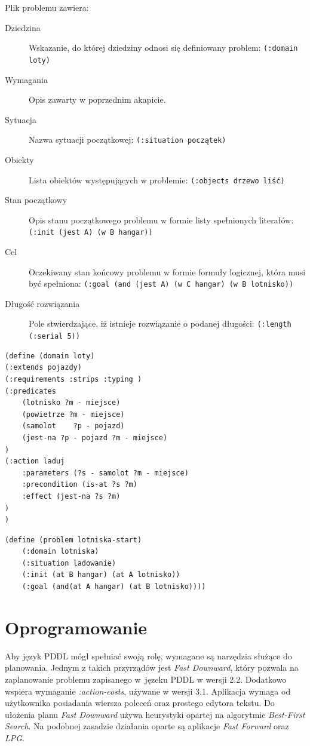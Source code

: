 Plik problemu zawiera:
\begin{description}
\item[Dziedzina] Wskazanie, do której dziedziny odnosi się definiowany problem: \texttt{(:domain loty)}
\item[Wymagania] Opis zawarty w poprzednim akapicie.
\item[Sytuacja] Nazwa sytuacji początkowej: \texttt{(:situation początek)}
\item[Obiekty] Lista obiektów występujących w problemie: \texttt{(:objects drzewo liść)}
\item[Stan początkowy] Opis stanu początkowego problemu w formie listy spełnionych literałów: \texttt{(:init (jest A) (w B hangar))}
\item[Cel] Oczekiwany stan końcowy problemu w formie formuły logicznej, która musi być spełniona: \texttt{(:goal (and (jest A) (w C hangar) (w B lotnisko))}
\item[Długość rozwiązania] Pole stwierdzające, iż istnieje rozwiązanie o podanej długości: \texttt{(:length (:serial 5))}
\end{description}
\begin{Code}
\begin{lstlisting}[language=LISP,frame=single,label=ana_code, caption=Zawartość przykładowego pliku domeny]
(define (domain loty)
(:extends pojazdy)
(:requirements :strips :typing )
(:predicates
	(lotnisko ?m - miejsce)
	(powietrze ?m - miejsce)
	(samolot	?p - pojazd)
	(jest-na ?p - pojazd ?m - miejsce)
)
(:action laduj
	:parameters (?s - samolot ?m - miejsce)
   	:precondition (is-at ?s ?m) 
	:effect (jest-na ?s ?m) 
)
)
\end{lstlisting}
\end{Code}

\begin{Code}
\begin{lstlisting}[language=LISP,frame=single,label=ana_code, caption=Zawartość przykładowego pliku problemu]
(define (problem lotniska-start)
	(:domain lotniska)
	(:situation ladowanie)
	(:init (at B hangar) (at A lotnisko))
	(:goal (and(at A hangar) (at B lotnisko))))
\end{lstlisting}
\end{Code}

\section{Oprogramowanie}
Aby język PDDL mógł spełniać swoją rolę, wymagane są narzędzia służące do planowania. Jednym z takich przyrządów jest \textit{Fast Downward}, który pozwala na zaplanowanie problemu zapisanego w~jęzeku PDDL w wersji 2.2. Dodatkowo wspiera wymaganie \textit{:action-costs}, używane w wersji 3.1. Aplikacja wymaga od użytkownika posiadania wiersza poleceń oraz prostego edytora tekstu. Do ułożenia planu \textit{Fast Downward} używa heurystyki opartej na algorytmie \textit{Best-First Search}. Na podobnej zasadzie działania oparte są aplikacje \textit{Fast Forward} oraz \textit{LPG}.

